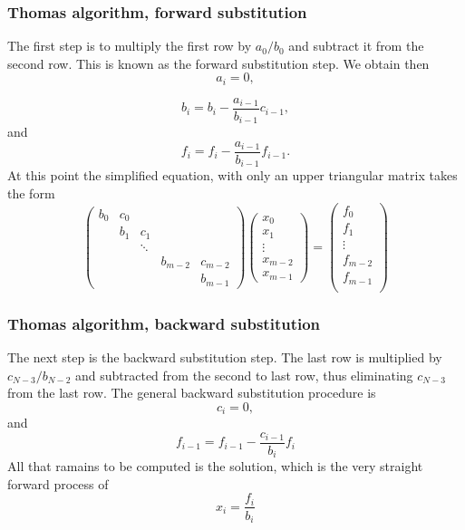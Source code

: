 \documentclass{beamer}
\begin{document}
\begin{frame}
\frametitle{Thomas algorithm, forward substitution}

\begin{block}{}
The first step is to multiply the first row by $a_0/b_0$ and subtract it from the second row.  This is known as the forward substitution step. We obtain then
\[
	a_i = 0,
\]

\[                                 
	b_i = b_i - \frac{a_{i-1}}{b_{i-1}}c_{i-1},
\]
and
\[
	f_i = f_i - \frac{a_{i-1}}{b_{i-1}}f_{i-1}.
\]
At this point the simplified equation, with only an upper triangular matrix takes the form
\[
\left( \begin{array}{ccccc}
    b_0 & c_0 &        &         &         \\
       & b_1 &  c_1    &         &         \\
          &    & \ddots &         &         \\
	     &     &        & b_{m-2} & c_{m-2} \\
	        &    &        &         & b_{m-1}
   \end{array} \right)\left( \begin{array}{c}
       x_0     \\
       x_1     \\
       \vdots  \\
       x_{m-2} \\
       x_{m-1}
   \end{array} \right)=\left( \begin{array}{c}
       f_0     \\
       f_1     \\
       \vdots  \\
       f_{m-2} \\
       f_{m-1} \\
   \end{array} \right)
\]
\end{block}
\end{frame}

\begin{frame}
\frametitle{Thomas algorithm, backward substitution}

\begin{block}{}
The next step is  the backward substitution step.  The last row is multiplied by $c_{N-3}/b_{N-2}$ and subtracted from the second to last row, thus eliminating $c_{N-3}$ from the last row.  The general backward substitution procedure is 
\[
	c_i = 0, 
\]
and 
\[
	f_{i-1} = f_{i-1} - \frac{c_{i-1}}{b_i}f_i
\]
All that ramains to be computed is the solution, which is the very straight forward process of
\[
x_i = \frac{f_i}{b_i}
\]
\end{block}
\end{frame}
\end{document}
